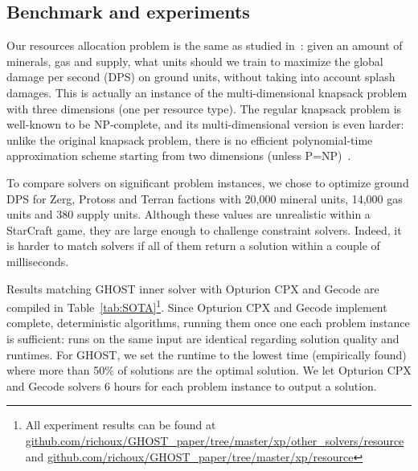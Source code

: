 \documentclass[journal]{IEEEtran}
\newcommand{\ghost}{\textsc{GHOST}\xspace}
\begin{document}
\subsection{Benchmark and experiments}

Our   resources   allocation   problem   is  the   same   as   studied
in~\cite{aiide15_rts}: given  an amount  of minerals, gas  and supply,
what units  should we train to  maximize the global damage  per second
(DPS) on  ground units,  without taking  into account  splash damages.
This is actually an instance of the multi-dimensional knapsack problem
with three  dimensions (one per  resource type). The  regular knapsack
problem  is well-known  to be  NP-complete, and  its multi-dimensional
version is even harder: unlike the original knapsack problem, there is
no efficient  polynomial-time approximation  scheme starting  from two
dimensions (unless P=NP)~\cite{KulikS10}.

To  compare solvers  on  significant problem  instances,  we chose  to
optimize ground DPS for Zerg,  Protoss and Terran factions with 20,000
mineral units, 14,000  gas units and 380 supply  units. Although these
values are unrealistic within a  StarCraft game, they are large enough
to challenge constraint solvers. Indeed, it is harder to match solvers
if all of them return a solution within a couple of milliseconds.

Results matching \ghost inner solver  with Opturion CPX and Gecode are
compiled  in  Table~\ref{tab:SOTA}\footnote{All  experiment results can     be     found     at
  \href{https://github.com/richoux/GHOST\_paper/tree/master/xp/other\_solvers/resource}{github.com/richoux/GHOST\_paper/tree/master/xp/other\_solvers/resource}
  and \href{https://github.com/richoux/GHOST\_paper/tree/master/xp/resource}{github.com/richoux/GHOST\_paper/tree/master/xp/resource}}.
Since Opturion CPX and Gecode
implement complete,  deterministic algorithms,  running them  once one
each  problem instance  is  sufficient:  runs on  the  same input  are
identical regarding solution quality and  runtimes. For \ghost, we set
the runtime  to the  lowest time (empirically  found) where  more than
50\% of solutions  are the optimal solution.  We let  Opturion CPX and
Gecode solvers 6 hours for each problem instance to output a solution.
\end{document}
